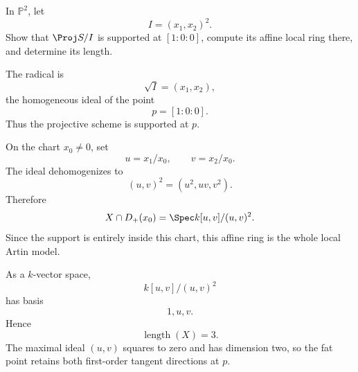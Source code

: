 \begin{problem}\label{prob:vi37-15}
In \(\mathbb P^2\), let
\[
I=(x_1,x_2)^2.
\]
Show that \(\Proj S/I\) is supported at \([1:0:0]\), compute its affine local ring there, and determine its length.

\end{problem}

\ifdefined\FullProblemDossiers
\begin{solution}
The radical is
\[
\sqrt I=(x_1,x_2),
\]
the homogeneous ideal of the point
\[
p=[1:0:0].
\]
Thus the projective scheme is supported at \(p\).

On the chart \(x_0\neq0\), set
\[
u=x_1/x_0,\qquad v=x_2/x_0.
\]
The ideal dehomogenizes to
\[
(u,v)^2=(u^2,uv,v^2).
\]
Therefore
\[
X\cap D_+(x_0)
=
\Spec k[u,v]/(u,v)^2.
\]
Since the support is entirely inside this chart, this affine ring is the whole local Artin model.

As a \(k\)-vector space,
\[
k[u,v]/(u,v)^2
\]
has basis
\[
1,u,v.
\]
Hence
\[
\boxed{\operatorname{length}(X)=3}.
\]
The maximal ideal \((u,v)\) squares to zero and has dimension two, so the fat point retains both first-order tangent directions at \(p\).
\end{solution}
\fi
